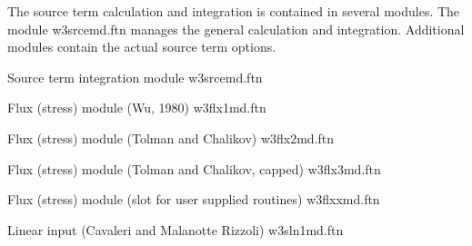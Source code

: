 \begin{flisti}

\end{flisti}

   


\noindent
The source term calculation and integration is contained in several
modules. The module {\file w3srcemd.ftn} manages the general calculation and
integration. Additional modules contain the actual source term options.

\vspace{\baselineskip} \noindent
Source term integration module \hfill {\file w3srcemd.ftn}

\begin{flisti}
\end{flisti}

\pb \noindent
Flux (stress) module (Wu, 1980) \hfill {\file w3flx1md.ftn}

\begin{flisti}
\end{flisti}

\noindent
Flux (stress) module (Tolman and Chalikov) \hfill {\file w3flx2md.ftn}

\begin{flisti}
\end{flisti}

\noindent
Flux (stress) module (Tolman and Chalikov, capped) \hfill {\file w3flx3md.ftn}

\begin{flisti}
\end{flisti}

\noindent
Flux (stress) module (slot for user supplied routines) \hfill {\file
w3flxxmd.ftn}

\begin{flisti}
\end{flisti}

\noindent
Linear input (Cavaleri and Malanotte Rizzoli) \hfill {\file w3sln1md.ftn}

